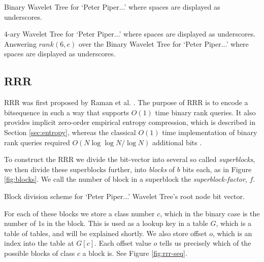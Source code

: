 			{Binary Wavelet Tree for `Peter Piper...' where spaces are displayed
			as underscores.}
			
			{4-ary Wavelet Tree for `Peter Piper...' where spaces are 
			displayed as underscores.}
\clearpage
			{Answering $rank(6, e)$ over the Binary Wavelet Tree for `Peter
			Piper...' where spaces are displayed as underscores.}












\subsection{RRR}
\label{sec:rrr}
RRR was first proposed by Raman et al. \cite{raman2007}. The purpose of RRR is 
to encode a bitsequence in such a way that supports $O(1)$ time binary rank 
queries. It also provides implicit zero-order empirical entropy compression, 
which is described in Section \ref{sec:entropy}, whereas the classical $O(1)$ 
time implementation of binary rank queries required $O(N \log \log N / \log N)$ 
additional bits \cite{gonzalez2005}.

To construct the RRR we divide the bit-vector into several so called 
\emph{superblocks}, we then divide these superblocks further, into 
\emph{blocks} of $b$ bits each, as in Figure \ref{fig:blocks}. We call the 
number of block in a superblock the \emph{superblock-factor}, $f$.

			{Block division scheme for `Peter Piper...' Wavelet Tree's root
			node bit vector.}

For each of these blocks we store a class number $c$, which in the binary case 
is the number of  $1$s in the block. This is used as a lookup key in a table 
$G$, which is a table of tables, and will be explained shortly. We also store 
offset $o$, which is an index into the table at $G[c]$. Each offset value $o$ 
tells us precisely which of the possible blocks of class $c$ a block is. See 
Figure \ref{fig:rrr-seq}.

